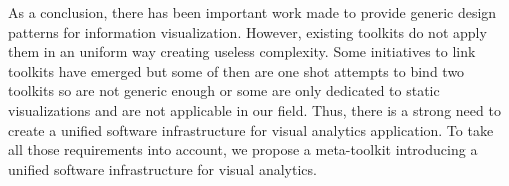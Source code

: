 As a conclusion, there has been important work made to provide generic design patterns
for information visualization. However, existing toolkits do not apply them in
an uniform way creating useless complexity. Some initiatives to link toolkits have
emerged but some of then are one shot attempts to bind two toolkits so are not generic
enough or some are only dedicated to static visualizations and are not applicable in our
field. Thus, there is a strong need to create a unified software infrastructure for visual
analytics application. To take all those requirements into account, we propose a meta-toolkit
introducing a unified software infrastructure for visual analytics.





